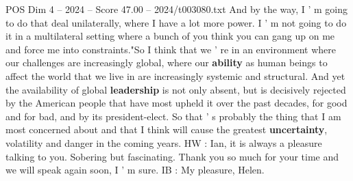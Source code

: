 \begin{textsample}{POS Dim 4 – 2024 – Score 47.00 – 2024/t003080.txt}
And by the way, I ' m going to do that deal unilaterally, where I have a lot more power.
I ' m not going to do it in a multilateral setting where a bunch of you think you can gang up on me and force me into constraints."So I think that we ' re in an environment where our challenges are increasingly global, where our \textbf{ability} as human beings to affect the world that we live in are increasingly systemic and structural.
And yet the availability of global \textbf{leadership} is not only absent, but is decisively rejected by the American people that have most upheld it over the past decades, for good and for bad, and by its president-elect.
So that ' s probably the thing that I am most concerned about and that I think will cause the greatest \textbf{uncertainty}, volatility and danger in the coming years.
HW : Ian, it is always a pleasure talking to you.
Sobering but fascinating.
Thank you so much for your time and we will speak again soon, I ' m sure.
IB : My pleasure, Helen.

\end{textsample}
